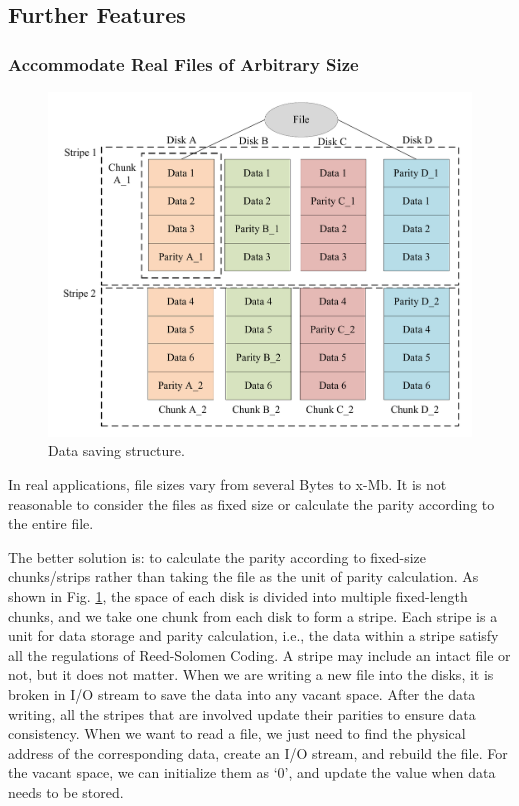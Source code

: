\documentclass[journal]{IEEEtran}
\begin{document}
\subsection{Further Features}
\subsubsection{Accommodate Real Files of Arbitrary Size}
\begin{figure}[htbp]
  \centering
  \includegraphics[width=0.9\linewidth]{Images/chunking_model.pdf}
  \caption{Data saving structure.}
  \label{fig:chunking_model}
\end{figure}
In real applications, file sizes vary from several Bytes to x-Mb. It is not reasonable to consider the files as fixed size or calculate the parity according to the entire file. 

The better solution is: to calculate the parity according to fixed-size chunks/strips rather than taking the file as the unit of parity calculation. As shown in Fig. \ref{fig:chunking_model}, the space of each disk is divided into multiple fixed-length chunks, and we take one chunk from each disk to form a stripe. Each stripe is a unit for data storage and parity calculation, i.e., the data within a stripe satisfy all the regulations of Reed-Solomen Coding. A stripe may include an intact file or not, but it does not matter. When we are writing a new file into the disks, it is broken in I/O stream to save the data into any vacant space. After the data writing, all the stripes that are involved update their parities to ensure data consistency. When we want to read a file, we just need to find the physical address of the corresponding data, create an I/O stream, and rebuild the file. For the vacant space, we can initialize them as `0', and update the value when data needs to be stored.
\end{document}
